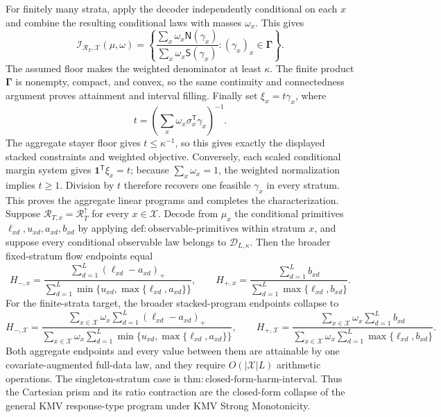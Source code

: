 For finitely many strata, apply the decoder independently conditional on each \(x\) and combine the resulting conditional laws with masses \(\omega_x\).  This gives
\[\mathcal I_{\mathcal R_T,\mathcal X}(\mu,\omega)
=\left\{\frac{\sum_x\omega_x\mathsf N(\gamma_x)}{\sum_x\omega_x\mathsf S(\gamma_x)}:
(\gamma_x)_x\in\boldsymbol\Gamma\right\}.\]
The assumed floor makes the weighted denominator at least \(\kappa\).  The finite product \(\boldsymbol\Gamma\) is nonempty, compact, and convex, so the same continuity and connectedness argument proves attainment and interval filling.  Finally set \(\xi_x=t\gamma_x\), where
\[t=\left(\sum_x\omega_x\sigma_x^{\mathsf T}\gamma_x\right)^{-1}.\]
The aggregate stayer floor gives \(t\le\kappa^{-1}\), so this gives exactly the displayed stacked constraints and weighted objective.  Conversely, each scaled conditional margin system gives \(\mathbf 1^{\mathsf T}\xi_x=t\); because \(\sum_x\omega_x=1\), the weighted normalization implies \(t\ge1\).  Division by \(t\) therefore recovers one feasible \(\gamma_x\) in every stratum.  This proves the aggregate linear programs and completes the characterization.
Suppose \(\mathcal R_{T,x}=\mathcal R_T^{\uparrow}\) for every \(x\in\mathcal X\).  Decode from \(\mu_x\) the conditional primitives \(\ell_{xd},u_{xd},a_{xd},b_{xd}\) by applying \(\mathrm{def{:}observable\mbox{-}primitives}\) within stratum \(x\), and suppose every conditional observable law belongs to \(\mathcal D_{L,\kappa}\).  Then the broader fixed-stratum flow endpoints equal
\[H_{-,x}=\frac{\sum_{d=1}^{L}(\ell_{xd}-a_{xd})_+}{\sum_{d=1}^{L}\min\{u_{xd},\max\{\ell_{xd},a_{xd}\}\}},\qquad
H_{+,x}=\frac{\sum_{d=1}^{L}b_{xd}}{\sum_{d=1}^{L}\max\{\ell_{xd},b_{xd}\}}.\]
For the finite-strata target, the broader stacked-program endpoints collapse to
\[H_{-,\mathcal X}=\frac{\sum_{x\in\mathcal X}\omega_x\sum_{d=1}^{L}(\ell_{xd}-a_{xd})_+}{\sum_{x\in\mathcal X}\omega_x\sum_{d=1}^{L}\min\{u_{xd},\max\{\ell_{xd},a_{xd}\}\}},\qquad
H_{+,\mathcal X}=\frac{\sum_{x\in\mathcal X}\omega_x\sum_{d=1}^{L}b_{xd}}{\sum_{x\in\mathcal X}\omega_x\sum_{d=1}^{L}\max\{\ell_{xd},b_{xd}\}}.\]
Both aggregate endpoints and every value between them are attainable by one covariate-augmented full-data law, and they require \(O(|\mathcal X|L)\) arithmetic operations.  The singleton-stratum case is \(\mathrm{thm{:}closed\mbox{-}form\mbox{-}harm\mbox{-}interval}\).  Thus the Cartesian prism and its ratio contraction are the closed-form collapse of the general KMV response-type program under KMV Strong Monotonicity.
